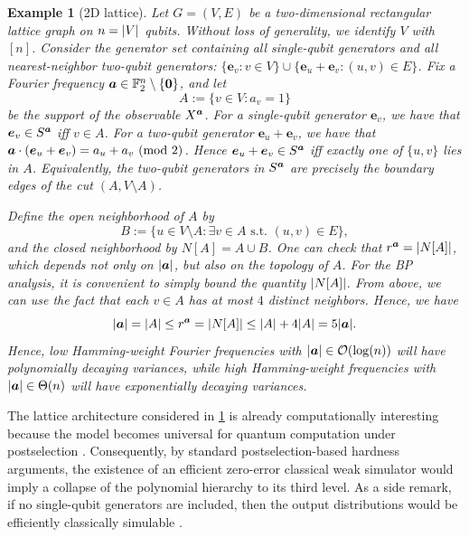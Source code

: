 \documentclass{article}
\theoremstyle{plain}
\newtheorem{example}[theorem]{Example}
\theoremstyle{definition}
\theoremstyle{remark}
\begin{document}
\begin{example}[2D lattice]
\label{eg:lattice}
Let $G=(V,E)$ be a two-dimensional rectangular lattice graph on $n=\abs{V}$ qubits. Without loss of generality, we identify $V$ with $[n]$. Consider the generator set containing all single-qubit generators and all nearest-neighbor two-qubit generators: $\{\bm{e}_v : v\in V\} \cup \{\bm{e}_u+\bm{e}_v : (u,v)\in E\}$. Fix a Fourier frequency ${\bm{a}} \in \mathbb{F}_2^n \setminus \{\bm{0}\}$, and let
\begin{equation*}
    A:=\{v\in V: a_v=1\}
\end{equation*}
be the support of the observable $X^{\bm{a}}$. For a single-qubit generator $\bm{e}_v$, we have that $\bm{e}_v\in S^{\bm{a}}$ iff $v\in A$. For a two-qubit generator $\bm{e}_u+\bm{e}_v$, we have that ${\bm{a}} \cdot (\bm{e}_u+\bm{e}_v)=a_u+a_v\ (\mathrm{mod}\ 2)$. Hence $\bm{e}_u+\bm{e}_v\in S^{\bm{a}}$ iff exactly one of $\{u,v\}$ lies in $A$. Equivalently, the two-qubit generators in $S^{\bm{a}}$ are precisely the boundary edges of the cut $(A, V\setminus A)$.

Define the open neighborhood of $A$ by
\begin{equation}
B := \{u\in V\setminus A: \exists v\in A  \text{ s.t. } (u,v)\in E\},
\end{equation}
and the closed neighborhood by $N[A] = A \cup B$.
One can check that $r^{\bm{a}} = \abs{N[A]}$, which depends not only on $\abs{{\bm{a}}}$, but also on the topology of $A$. For the BP analysis, it is convenient to simply bound the quantity $\abs{N[A]}$.
From above, we can use the fact that each $v\in A$ has at most $4$ distinct neighbors. Hence, we have
\begin{equation}
\abs{{\bm{a}}}=\abs{A} \leq  r^{\bm{a}}=\abs{N[A]} \leq \abs{A}+4\abs{A} = 5\abs{{\bm{a}}}.
\end{equation}
Hence, low Hamming-weight Fourier frequencies with $\abs{{\bm{a}}} \in \mathcal{O}(\log(n))$ will have polynomially decaying variances, while high Hamming-weight frequencies with $\abs{{\bm{a}}} \in \Theta(n)$ will have exponentially decaying variances.
\end{example}

The lattice architecture considered in \cref{eg:lattice} is already computationally interesting because the model becomes universal for quantum computation under postselection \cite{Fujii17}. Consequently, by standard postselection-based hardness arguments, the existence of an efficient zero-error classical weak simulator would imply a collapse of the polynomial hierarchy to its third level. As a side remark, if no single-qubit generators are included, then the output distributions would be efficiently classically simulable \cite{Fujii17}.
\end{document}
